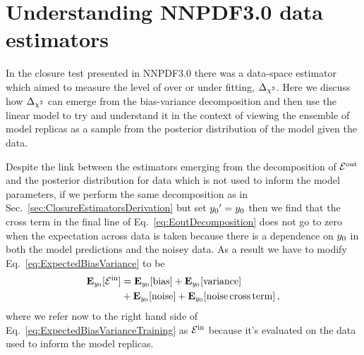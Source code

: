 \section{Understanding NNPDF3.0 data estimators}

In the closure test presented in NNPDF3.0 \cite{nnpdf30} there was a data-space
estimator which aimed to measure the level of over or under fitting, $\Delta_{\chi^2}$.
Here we discuss how $\Delta_{\chi^2}$ can emerge from the bias-variance decomposition
and then use the linear model to try and understand it in the context of
viewing the ensemble of model replicas as a sample from the posterior distribution
of the model given the data.

Despite the link between the estimators emerging from the decomposition of
$\mathcal{E}^{\rm out}$ and the posterior distribution for data which is not used to inform
the model parameters, if we perform the same decomposition as in
Sec.~\ref{sec:ClosureEstimatorsDerivation} but set
${{y_0}^{\prime}}=y_0$ then we find that the cross term
in the final line of Eq.~\ref{eq:EoutDecomposition} does not go to zero when
the expectation across data is taken because there is a dependence on
$y_0$ in both the model predictions and the noisey data. As a result
we have to modify Eq.~\ref{eq:ExpectedBiasVariance} to be
\begin{align}\label{eq:ExpectedBiasVarianceTraining}
    \mathbf{E}_{y_0}[\mathcal{E}^{\rm in}] &=
    \mathbf{E}_{y_0}[{\rm bias}] + 
    \mathbf{E}_{y_0}[{\rm variance}] \nonumber \\ 
    &+\mathbf{E}_{y_0}[{\rm noise}] +
    \mathbf{E}_{y_0}[{\rm noise \, cross \, term}]\, ,
\end{align}
where we refer now to the right hand side of
Eq.~\ref{eq:ExpectedBiasVarianceTraining} as $\mathcal{E}^{\rm in}$ because it's evaluated on the
data used to inform the model replicas.

